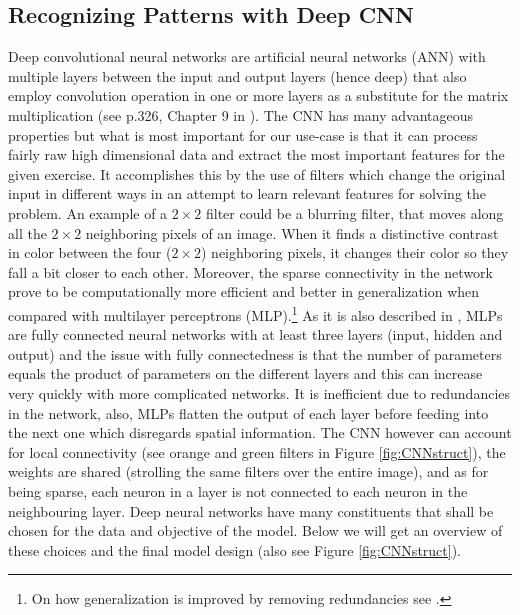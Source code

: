 \documentclass[12pt, a4paper]{article}
\begin{document}
\subsection{Recognizing Patterns with Deep CNN}
\label{subsec:DM:RecPatwCNN}

Deep convolutional neural networks are artificial neural networks (ANN) with multiple layers between the input and output layers (hence deep) that also employ convolution operation in one or more layers as a substitute for the matrix multiplication (see p.326, Chapter 9 in \cite{goodfellow2016deep}). 
The CNN has many advantageous properties but what is most important for our use-case is that it can process fairly raw high dimensional data and extract the most important features for the given exercise. It accomplishes this by the use of filters which change the original input in different ways in an attempt to learn relevant features for solving the problem. 
An example of a $2 \times 2$ filter could be a blurring filter, that moves along all the $2 \times 2$ neighboring pixels of an image. When it finds a distinctive contrast in color between the four ($2 \times 2$) neighboring pixels, it changes their color so they fall a bit closer to each other. Moreover, the sparse connectivity in the network prove to be computationally more efficient and better in generalization when compared with multilayer perceptrons (MLP).\footnote{On how generalization is improved by removing redundancies see \cite{chakraborty1999effect}.} 
As it is also described in \cite{MLPmedium}, MLPs are fully connected neural networks with at least three layers (input, hidden and output) and the issue with fully connectedness is that the number of parameters equals the product of parameters on the different layers and this can increase very quickly with more complicated networks. 
It is inefficient due to redundancies in the network, also, MLPs flatten the output of each layer before feeding into the next one which disregards spatial information. The CNN however can account for local connectivity (see orange and green filters in Figure \ref{fig:CNNstruct}), the weights are shared (strolling the same filters over the entire image), and as for being sparse, each neuron in a layer is not connected to each neuron in the neighbouring layer. 
Deep neural networks have many constituents that shall be chosen for the data and objective of the model. Below we will get an overview of these choices and the final model design (also see Figure \ref{fig:CNNstruct}).
\end{document}
